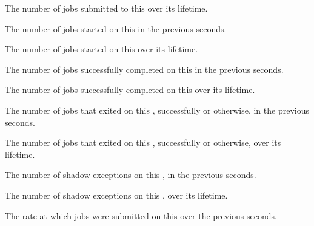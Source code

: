 \begin{description}
\item[\AdAttr{JobsSubmittedCumulative}:] The number of jobs submitted to
  this  over its lifetime.

\item[\AdAttr{JobsStarted}:] The number of jobs started on this
   in the previous 
  seconds.

\item[\AdAttr{JobsStartedCumulative}:] The number of jobs started on this
   over its lifetime.

\item[\AdAttr{JobsCompleted}:] The number of jobs successfully completed
  on this  in the previous 
  seconds.

\item[\AdAttr{JobsCompletedCumulative}:] The number of jobs 
  successfully completed on this  over its lifetime.

\item[\AdAttr{JobsExited}:] The number of jobs that exited
  on this , successfully or otherwise, in the 
  previous  seconds.

\item[\AdAttr{JobsExitedCumulative}:] The number of jobs that exited
  on this , successfully or otherwise, over
  its lifetime.

\item[\AdAttr{ShadowExceptions}:] The number of shadow 
  exceptions on this , in the 
  previous  seconds.

\item[\AdAttr{ShadowExceptionsCumulative}:] The number of shadow 
  exceptions on this , over its lifetime.

\item[\AdAttr{JobSubmissionRate}:] The rate at which jobs were
  submitted on this  over the previous 
   seconds.


\end{description}
